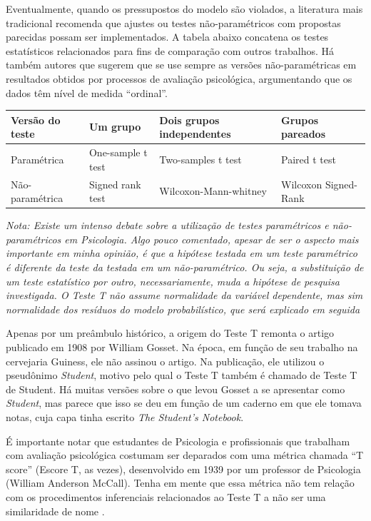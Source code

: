\documentclass[
]{book}
\begin{document}
Eventualmente, quando os pressupostos do modelo são violados, a literatura mais tradicional recomenda que ajustes ou testes não-paramétricos com propostas parecidas possam ser implementados. A tabela abaixo concatena os testes estatísticos relacionados para fins de comparação com outros trabalhos. Há também autores que sugerem que se use sempre as versões não-paramétricas em resultados obtidos por processos de avaliação psicológica, argumentando que os dados têm nível de medida ``ordinal''.

\begin{longtable}[]{@{}llll@{}}
\toprule
Versão do teste & Um grupo & Dois grupos independentes & Grupos pareados \\
\midrule
\endhead
Paramétrica & One-sample t test & Two-samples t test & Paired t test \\
Não-paramétrica & Signed rank test & Wilcoxon-Mann-whitney & Wilcoxon Signed-Rank \\
\bottomrule
\end{longtable}

\emph{Nota: Existe um intenso debate sobre a utilização de testes paramétricos e não-paramétricos em Psicologia. Algo pouco comentado, apesar de ser o aspecto mais importante em minha opinião, é que a hipótese testada em um teste paramétrico é diferente da teste da testada em um não-paramétrico. Ou seja, a substituição de um teste estatístico por outro, necessariamente, muda a hipótese de pesquisa investigada. O Teste T não assume normalidade da variável dependente, mas sim normalidade dos resíduos do modelo probabilístico, que será explicado em seguida}

Apenas por um preâmbulo histórico, a origem do Teste T remonta o artigo publicado em 1908 por William Gosset. Na época, em função de seu trabalho na cervejaria Guiness, ele não assinou o artigo. Na publicação, ele utilizou o pseudônimo \emph{Student}, motivo pelo qual o Teste T também é chamado de Teste T de Student. Há muitas versões sobre o que levou Gosset a se apresentar como \emph{Student}, mas parece que isso se deu em função de um caderno em que ele tomava notas, cuja capa tinha escrito \emph{The Student's Notebook}.

É importante notar que estudantes de Psicologia e profissionais que trabalham com avaliação psicológica costumam ser deparados com uma métrica chamada ``T score'' (Escore T, as vezes), desenvolvido em 1939 por um professor de Psicologia (William Anderson McCall). Tenha em mente que essa métrica não tem relação com os procedimentos inferenciais relacionados ao Teste T a não ser uma similaridade de nome \citep{Krus1977}.
\end{document}

